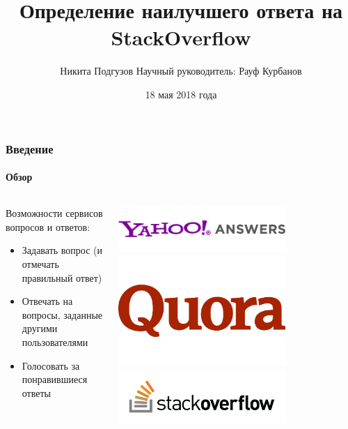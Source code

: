 \documentclass[10pt]{beamer}
\title[Определение наилучшего ответа на SO]{Определение наилучшего ответа на StackOverflow}
\author[Никита Подгузов]{
Никита Подгузов 
\texorpdfstring{\vskip0.5cm \footnotesize{Научный руководитель: Рауф Курбанов}}{}
}
\institute[СПбАУ]{Санкт-Петербургский Академический университет}
\date{18 мая 2018 года}
\begin{document}

\begin{frame}
\titlepage
\end{frame}


\begin{frame}
\frametitle{Введение}
\framesubtitle{Обзор}

\begin{columns}
    \begin{column}{0.6\textwidth}
        Возможности сервисов вопросов и ответов:
        \begin{itemize}
            \item Задавать вопрос (и отмечать правильный ответ) 
            \item Отвечать на вопросы, заданные другими пользователями
            \item Голосовать за понравившиеся ответы
        \end{itemize}
    \end{column}
    \begin{column}{0.4\textwidth}
        \begin{center}
            \includegraphics[width=0.7\textwidth]{images/yahoo_answers_logo.png} \\
            \includegraphics[width=0.7\textwidth]{images/quora_logo.png} \\
            \includegraphics[width=0.7\textwidth]{images/stackoverflow_logo.png}
        \end{center}
    \end{column}
\end{columns}
\end{frame}
\end{document}
